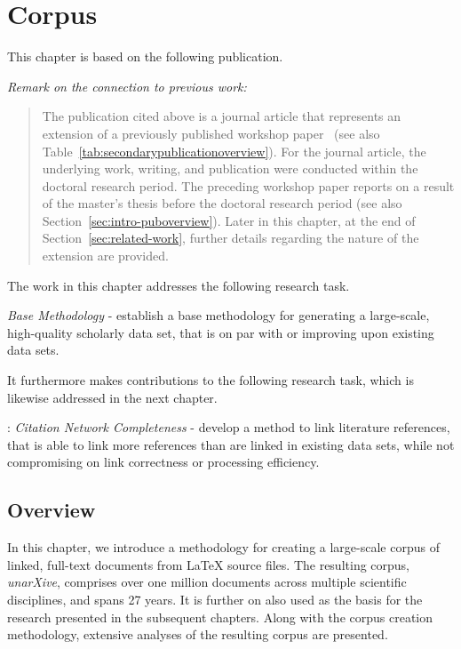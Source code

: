 \chapter{Corpus}
\label{chp:corpus}

This chapter is based on the following publication.

\begin{infobox-pub}
\end{infobox-pub}
\vspace{-0.5em}
\begin{footnotesize}
\textit{Remark on the connection to previous work:}
\vspace{-0.5em}
\begin{quote}
The publication cited above is a journal article that represents an extension of a previously published workshop paper~\cite{Saier2019} (see also Table~\ref{tab:secondarypublicationoverview}). For the journal article, the underlying work, writing, and publication were conducted within the doctoral research period. The preceding workshop paper reports on a result of the master's thesis before the doctoral research period (see also Section~\ref{sec:intro-puboverview}). Later in this chapter, at the end of Section~\ref{sec:related-work}, further details regarding the nature of the extension are provided.
\end{quote}
\end{footnotesize}

The work in this chapter addresses the following research task.

\begin{rtlist}
    \item \textit{Base Methodology} - establish a base methodology for generating a large-scale, high-quality scholarly data set, that is on par with or improving upon existing data sets.
\end{rtlist}

It furthermore makes contributions to the following research task, which is likewise addressed in the next chapter.

\begin{rtlist}
    \item[\rtmark{2}:] \textit{Citation Network Completeness} - develop a method to link literature references, that is able to link more references than are linked in existing data sets, while not compromising on link correctness or processing efficiency.
\end{rtlist}

\section{Overview}
In this chapter, we introduce a methodology for creating a large-scale corpus of linked, full-text documents from \LaTeX{} source files. The resulting corpus, \emph{unarXive}, comprises over one million documents across multiple scientific disciplines, and spans 27 years. It is further on also used as the basis for the research presented in the subsequent chapters. Along with the corpus creation methodology, extensive analyses of the resulting corpus are presented.

